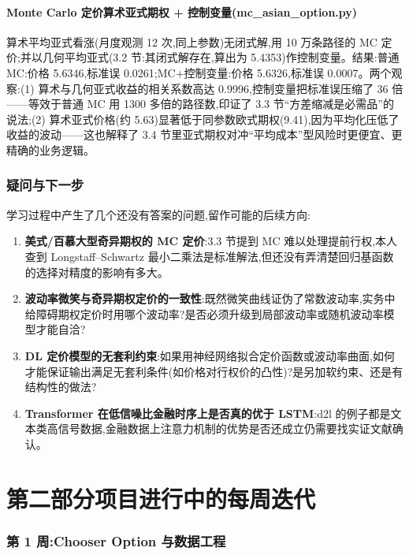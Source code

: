 \documentclass[11pt]{ctexart}
\begin{document}
\subsection{Monte Carlo 定价算术亚式期权 + 控制变量(mc\_asian\_option.py)}
算术平均亚式看涨(月度观测 12 次,同上参数)无闭式解,用 10 万条路径的 MC 定价;并以几何平均亚式(3.2 节:其闭式解存在,算出为 5.4353)作控制变量。结果:普通 MC:价格 5.6346,标准误 0.0261;MC+控制变量:价格 5.6326,标准误 0.0007。两个观察:(1) 算术与几何亚式收益的相关系数高达 0.9996,控制变量把标准误压缩了 36 倍——等效于普通 MC 用 1300 多倍的路径数,印证了 3.3 节``方差缩减是必需品''的说法;(2) 算术亚式价格(约 5.63)显著低于同参数欧式期权(9.41),因为平均化压低了收益的波动——这也解释了 3.4 节里亚式期权对冲``平均成本''型风险时更便宜、更精确的业务逻辑。

\section{疑问与下一步}\label{sec:questions}
学习过程中产生了几个还没有答案的问题,留作可能的后续方向:
\begin{enumerate}
  \item \textbf{美式/百慕大型奇异期权的 MC 定价}:3.3 节提到 MC 难以处理提前行权,本人查到 Longstaff--Schwartz 最小二乘法是标准解法,但还没有弄清楚回归基函数的选择对精度的影响有多大。
  \item \textbf{波动率微笑与奇异期权定价的一致性}:既然微笑曲线证伪了常数波动率,实务中给障碍期权定价时用哪个波动率?是否必须升级到局部波动率或随机波动率模型才能自洽?
  \item \textbf{DL 定价模型的无套利约束}:如果用神经网络拟合定价函数或波动率曲面,如何才能保证输出满足无套利条件(如价格对行权价的凸性)?是另加软约束、还是有结构性的做法?
  \item \textbf{Transformer 在低信噪比金融时序上是否真的优于 LSTM}:d2l 的例子都是文本类高信号数据,金融数据上注意力机制的优势是否还成立仍需要找实证文献确认。
\end{enumerate}

\part*{第二部分\quad 项目进行中的每周迭代}

\section{第 1 周:Chooser Option 与数据工程}
\end{document}
